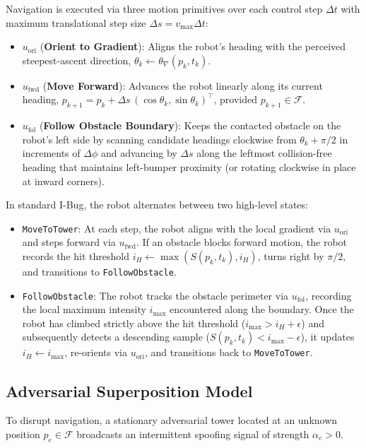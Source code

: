 \documentclass[12pt, a4paper]{article}
\begin{document}
Navigation is executed via three motion primitives over each control step $\Delta t$ with maximum translational step size $\Delta s = v_{\max}\Delta t$:
\begin{itemize}
    \item $u_{\text{ori}}$ (\textbf{Orient to Gradient}): Aligns the robot's heading with the perceived steepest-ascent direction, $\theta_k \leftarrow \theta_{\nabla}(p_k, t_k)$.
    \item $u_{\text{fwd}}$ (\textbf{Move Forward}): Advances the robot linearly along its current heading, $p_{k+1} = p_k + \Delta s \, (\cos\theta_k, \sin\theta_k)^\top$, provided $p_{k+1} \in \mathcal{F}$.
    \item $u_{\text{fol}}$ (\textbf{Follow Obstacle Boundary}): Keeps the contacted obstacle on the robot's left side by scanning candidate headings clockwise from $\theta_k + \pi/2$ in increments of $\Delta\phi$ and advancing by $\Delta s$ along the leftmost collision-free heading that maintains left-bumper proximity (or rotating clockwise in place at inward corners).
\end{itemize}

In standard I-Bug, the robot alternates between two high-level states:
\begin{itemize}
    \item \texttt{MoveToTower}: At each step, the robot aligns with the local gradient via $u_{\text{ori}}$ and steps forward via $u_{\text{fwd}}$. If an obstacle blocks forward motion, the robot records the hit threshold $i_H \leftarrow \max(S(p_k, t_k), i_H)$, turns right by $\pi/2$, and transitions to \texttt{FollowObstacle}.
    \item \texttt{FollowObstacle}: The robot tracks the obstacle perimeter via $u_{\text{fol}}$, recording the local maximum intensity $i_{\text{max}}$ encountered along the boundary. Once the robot has climbed strictly above the hit threshold ($i_{\text{max}} > i_H + \epsilon$) and subsequently detects a descending sample ($S(p_k, t_k) < i_{\text{max}} - \epsilon$), it updates $i_H \leftarrow i_{\text{max}}$, re-orients via $u_{\text{ori}}$, and transitions back to \texttt{MoveToTower}.
\end{itemize}

\subsection{Adversarial Superposition Model}
To disrupt navigation, a stationary adversarial tower located at an unknown position $p_e \in \mathcal{F}$ broadcasts an intermittent spoofing signal of strength $\alpha_e > 0$.
\end{document}
